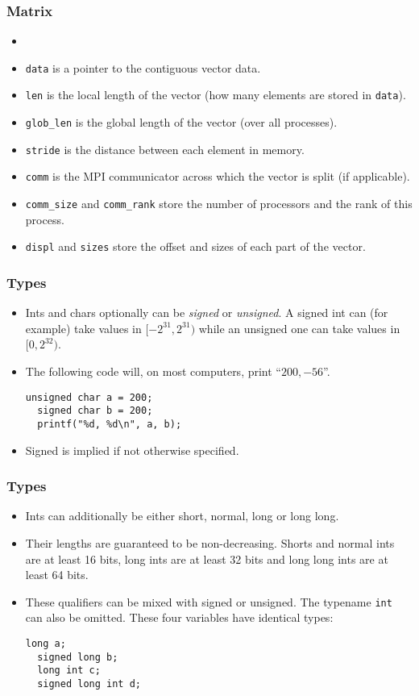 \begin{frame}[fragile]
  \frametitle{Matrix}
  \begin{itemize}
  \item \texttt{}
  \item \texttt{data} is a pointer to the contiguous vector data.
  \item \texttt{len} is the local length of the vector (how many elements are
    stored in \texttt{data}).
  \item \texttt{glob\_len} is the global length of the vector (over all
    processes).
  \item \texttt{stride} is the distance between each element in memory.
  \item \texttt{comm} is the MPI communicator across which the vector is split
    (if applicable).
  \item \texttt{comm\_size} and \texttt{comm\_rank} store the number of
    processors and the rank of this process.
  \item \texttt{displ} and \texttt{sizes} store the offset and sizes of each
    part of the vector.
  \end{itemize}
\end{frame}

\begin{frame}[fragile]
  \frametitle{Types}
  \begin{itemize}
  \item Ints and chars optionally can be \emph{signed} or \emph{unsigned}. A
    signed int can (for example) take values in $[-2^{31}, 2^{31})$ while an
    unsigned one can take values in $[0,2^{32})$.
  \item The following code will, on most computers, print ``$200, -56$''.
\begin{lstlisting}[style=c]
  unsigned char a = 200;
  signed char b = 200;
  printf("%d, %d\n", a, b);
\end{lstlisting}
  \item Signed is implied if not otherwise specified.
  \end{itemize}
\end{frame}

\begin{frame}[fragile]
  \frametitle{Types}
  \begin{itemize}
  \item Ints can additionally be either short, normal, long or long long.
  \item Their lengths are guaranteed to be non-decreasing. Shorts and normal
    ints are at least 16 bits, long ints are at least 32 bits and long long ints
    are at least 64 bits.
  \item These qualifiers can be mixed with signed or unsigned. The typename
    \texttt{int} can also be omitted. These four variables have identical types:
\begin{lstlisting}[style=c]
  long a;
  signed long b;
  long int c;
  signed long int d;
\end{lstlisting}
  \end{itemize}
\end{frame}

